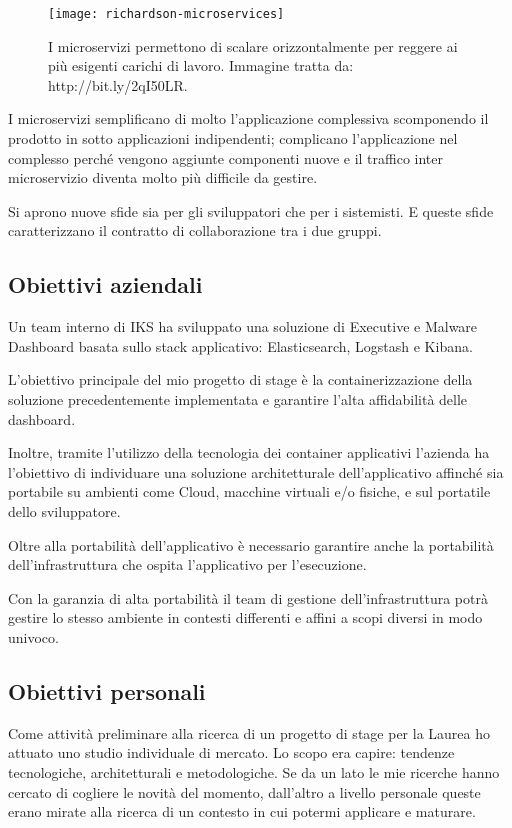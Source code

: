 \begin{figure}[htbp]
	\begin{center}
		\texttt{[image: richardson-microservices]}
		\caption{I microservizi permettono di scalare orizzontalmente per reggere ai più esigenti carichi di lavoro. Immagine tratta da: http://bit.ly/2qI50LR.}
	\end{center}
\end{figure}

I microservizi semplificano di molto l'applicazione complessiva scomponendo il prodotto in sotto applicazioni indipendenti; complicano l'applicazione nel complesso perché vengono aggiunte componenti nuove e il traffico inter microservizio diventa molto più difficile da gestire.

Si aprono nuove sfide sia per gli sviluppatori che per i sistemisti. 
E queste sfide caratterizzano il contratto di collaborazione tra i due gruppi. 




\subsection{Obiettivi aziendali}

Un team interno di IKS ha sviluppato una soluzione di Executive e Malware Dashboard
basata sullo stack applicativo: Elasticsearch, Logstash e Kibana.
 
L'obiettivo principale del mio progetto di stage è la containerizzazione della 
soluzione precedentemente implementata e garantire l'alta affidabilità delle dashboard. 

Inoltre, tramite l'utilizzo della tecnologia dei container applicativi l'azienda 
ha l'obiettivo di individuare una soluzione architetturale dell'applicativo affinché sia portabile su ambienti come Cloud, macchine virtuali e/o fisiche, e sul portatile dello sviluppatore. 

Oltre alla portabilità dell'applicativo è necessario garantire anche la portabilità dell'infrastruttura che ospita l'applicativo per l'esecuzione.

Con la garanzia di alta portabilità il team di gestione dell'infrastruttura potrà gestire lo stesso ambiente in contesti differenti e affini a scopi diversi in modo univoco. 


\subsection{Obiettivi personali}
Come attività preliminare alla ricerca di un progetto di stage per la Laurea ho 
attuato uno studio individuale di mercato. Lo scopo era capire: tendenze 
tecnologiche, architetturali e metodologiche. Se da un lato le mie ricerche 
hanno cercato di cogliere le novità del momento, dall'altro a livello personale 
queste erano mirate alla ricerca di un contesto in cui potermi applicare e maturare. 

